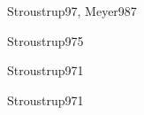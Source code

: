 \begin{syllabus}
\begin{unit}{\PLSIXDef}{Stroustrup97, Meyer98}{7}
   \begin{learningoutcomes}
      \item \PLSIXObjONE
      \item \PLSIXObjTWO
      \item \PLSIXObjTHREE
      \item \PLSIXObjFOUR
      \item \PLSIXObjFIVE
      \item \PLSIXObjSIX
      \item \PLSIXObjSEVEN
   \end{learningoutcomes}
\end{unit}

\begin{unit}{\SEONEDef}{Stroustrup97}{5}
   \begin{topics}
      \item \SEONETopicConceptos
      \item \SEONETopicDiseno
      \item \SEONETopicDisenopara
   \end{topics}
   \begin{learningoutcomes}
      \item \SEONEObjONE
      \item \SEONEObjFIVE
   \end{learningoutcomes}
\end{unit}

\begin{unit}{\SETWODef}{Stroustrup97}{1}
   \begin{topics}
   	\item \SETWOTopicProgramacion
	\item \SETWOTopicClass
	\item \SETWOTopicProgramacionpor
   \end{topics}
   \begin{learningoutcomes}
   	\item \SETWOObjONE
	\item \SETWOObjTWO
   \end{learningoutcomes}
\end{unit}

\begin{unit}{\SEFIVEDef}{Stroustrup97}{1}
   \begin{topics}
   	\item \SEFIVETopicRequerimientos
	\item \SEFIVETopicPrototipeo
	\item \SEFIVETopicConceptos
   \end{topics}
   \begin{learningoutcomes}
   	\item \SEFIVEObjTWO
	\item \SEFIVEObjTHREE
	\item \SEFIVEObjFIVE
   \end{learningoutcomes}
\end{unit}


\end{syllabus}
